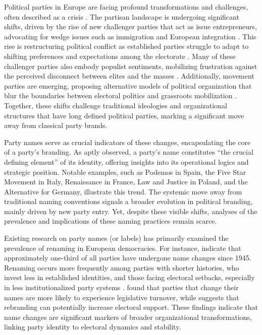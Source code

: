 \documentclass[12pt]{article}
\begin{document}
Political parties in Europe are facing profound transformations and challenges, often described as a crisis \citep[][]{Mair_2013}. The partisan landscape is undergoing significant shifts, driven by the rise of new challenger parties that act as issue entrepreneurs, advocating for wedge issues such as immigration and European integration \citep[][]{deVries_Hobolt_2020, de_Wilde_Koopmans_Merkel_Strijbis_Zurn_2019}. This rise is restructuring political conflict as established parties struggle to adapt to shifting preferences and expectations among the electorate \citep[][]{Hooghe_Marks_2018, Kriesi_et_al_2008, Kriesi_et_al_2012}. Many of these challenger parties also embody populist sentiments, mobilizing frustration against the perceived disconnect between elites and the masses \citep[][]{Mudde_2007, Van_Kessel_2015}. Additionally, movement parties are emerging, proposing alternative models of political organization that blur the boundaries between electoral politics and grassroots mobilization \citep[][]{della_Porta_et_al_2017, Castelli_Gattinara_Pirro_2024}. Together, these shifts challenge traditional ideologies and organizational structures that have long defined political parties, marking a significant move away from classical party brands.

Party names serve as crucial indicators of these changes, encapsulating the core of a party's branding. As \citet[][]{Epstein_1966} aptly observed, a party's name constitutes ``the crucial defining element'' of its identity, offering insights into its operational logics and strategic position. Notable examples, such as Podemos in Spain, the Five Star Movement in Italy, Renaissance in France, Law and Justice in Poland, and the Alternative for Germany, illustrate this trend. The systemic move away from traditional naming conventions signals a broader evolution in political branding, mainly driven by new party entry. Yet, despite these visible shifts, analyses of the prevalence and implications of these naming practices remain scarce.

Existing research on party names (or labels) has primarily examined the prevalence of renaming in European democracies. For instance, \citet[][]{Kim_Solt_2017} indicate that approximately one-third of all parties have undergone name changes since 1945. Renaming occurs more frequently among parties with shorter histories, who invest less in established identities, and those facing electoral setbacks, especially in less institutionalized party systems \citep[see also][]{Avina_Spoon_2024, Casiraghi_Cusumano_Chryssogelos_2023, Ibenskas_Sikk_2017}. \citet[][]{Gouglas_Katz_Maddens_Brans_2021} found that parties that change their names are more likely to experience legislative turnover, while \citet[][]{Avina_2023} suggests that rebranding can potentially increase electoral support. These findings indicate that name changes are significant markers of broader organizational transformations, linking party identity to electoral dynamics and stability.
\end{document}

